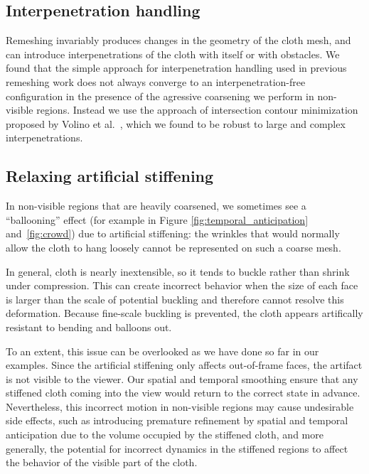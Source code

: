 \documentclass[10pt,journal,compsoc,twoside]{TexInputs/IEEEtran}
\begin{document}
\subsection{Interpenetration handling}

Remeshing invariably produces changes in the geometry of the cloth mesh, and can introduce interpenetrations of the cloth with itself or with obstacles.
We found that the simple approach for interpenetration handling used in previous remeshing work \cite{Narain:2012:AAR} does not always converge to an interpenetration-free configuration in the presence of the agressive coarsening we perform in non-visible regions.
Instead we use the approach of intersection contour minimization proposed by Volino et al.~\cite{Volino:2006:RSC}, which we found to be robust to large and complex interpenetrations.

\subsection{Relaxing artificial stiffening}

In non-visible regions that are heavily coarsened, we sometimes see a ``ballooning'' effect
(for example in Figure \ref{fig:temporal_anticipation} and~\ref{fig:crowd}) due to
artificial stiffening: the wrinkles that would normally allow the cloth to hang loosely
cannot be represented on such a coarse mesh.

In general, cloth is nearly inextensible, so it tends to buckle rather than shrink
under compression.  This can create incorrect behavior when the size of each face is
larger than the scale of potential buckling and therefore cannot resolve this deformation. Because fine-scale buckling is prevented, the cloth appears artifically resistant to bending and balloons out.

To an extent, this issue can be overlooked as we have done so far in our examples. Since the artificial stiffening only affects out-of-frame faces, the
artifact is not visible to the viewer. Our spatial and temporal smoothing ensure that any
stiffened cloth coming into the view would return to the correct state in advance.
Nevertheless, this incorrect motion in non-visible regions may cause undesirable side effects, such as introducing premature
refinement by spatial and temporal anticipation due to the volume occupied by the stiffened cloth, and more generally, the potential for incorrect dynamics in the stiffened regions to affect the behavior of the visible part of the cloth.
\end{document}
